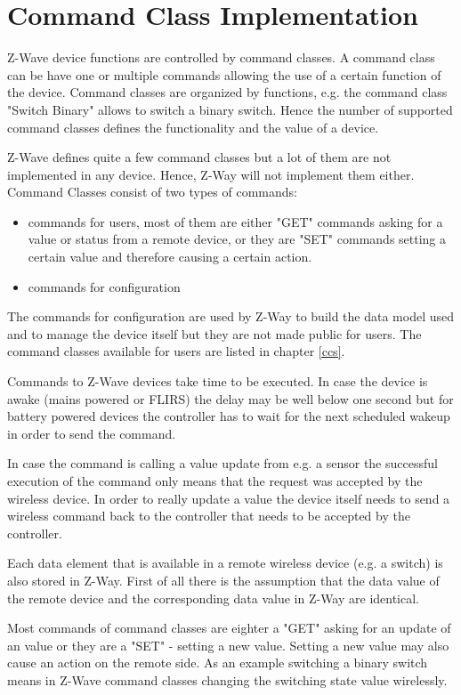 \section{Command Class Implementation} 
 
Z-Wave device functions are controlled by command classes. A command class can be have one or  multiple commands
allowing the use of a certain function of the device. Command classes are organized by functions, e.g. the command class "Switch Binary" allows to switch 
a binary switch. Hence the number of supported command classes defines the functionality and the value of 
a device.

Z-Wave defines quite a few command classes but a lot of them are not implemented in any device. Hence, Z-Way will not implement them 
either. Command Classes consist of two types of commands:
\begin{itemize}
\item commands for users, most of them are either "GET" commands asking for a value or status from a remote device, or they are "SET" commands setting
 a certain value and therefore causing a certain action.
\item commands for configuration
 \end{itemize}

The commands for configuration are used by Z-Way to build the data model used and to manage the device itself but they are not made public for users. 
The command classes available for users are listed in chapter \ref {ccs}.

Commands to Z-Wave devices take time to be executed. In case the device is awake (mains powered or FLIRS) the delay may be well below one second but for 
battery powered  devices the controller has to wait for the next scheduled wakeup in order to send the command. 

In case the command is calling a value update from e.g. a sensor the successful execution of the command only means that the request was accepted by the
wireless device. In order to really update a value the device itself needs to send a wireless command back to the controller that needs to be accepted by the 
controller.    

Each data element that is available in a remote wireless device (e.g. a switch) is also stored in  Z-Way. First of all there is the assumption that the data value of the remote device
and the corresponding data value in Z-Way are identical.

 Most commands of command classes are eighter a "GET" asking for an update of an value or they are a "SET" - setting a new value. Setting a new 
 value may also cause an action on the remote side. As an example switching a binary switch means in Z-Wave command classes changing the switching  
 state value wirelessly.

